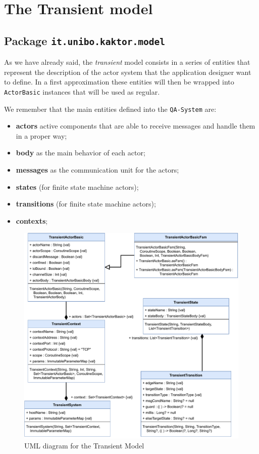 \section{The Transient model}
\subsection{Package \texttt{it.unibo.kaktor.model}}

As we have already said, the \textit{transient} model consists in a series of entities that represent the description of the actor system that the application designer want to define.
In a first approximation these entities will then be wrapped into \texttt{ActorBasic} instances that will be used as regular.

We remember that the main entities defined into the \texttt{QA-System} are:
\begin{itemize}
	\item \textbf{actors} active components that are able to receive messages and handle them in a proper way;
	\item \textbf{body} as the main behavior of each actor;
	\item \textbf{messages} as the communication unit for the actors;
	\item \textbf{states} (for finite state machine actors);
	\item \textbf{transitions} (for finite state machine actors);
	\item \textbf{contexts};
\end{itemize}

\begin{figure}[h]
	\centering
	\includegraphics[width=\textwidth]{img/[UML]it.unibo.kaktor.model}
	\caption{UML diagram for the Transient Model}
	\label{fig::uml_model}
\end{figure}

